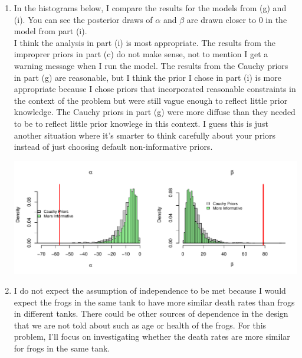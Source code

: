\documentclass[12pt]{article}\usepackage[]{graphicx}\usepackage[]{color}
\newenvironment{knitrout}{}{} %
\begin{document}
\begin{enumerate}
\begin{enumerate}
\begin{knitrout}
\end{knitrout}


\item In the histograms below, I compare the results for the models from (g) and (i). You can see the posterior draws of $\alpha$ and $\beta$ are drawn closer to $0$ in the model from part (i). \\

I think the analysis in part (i) is most appropriate. The results from the improprer priors in part (c) do not make sense, not to mention I get a warning message when I run the model. The results from the Cauchy priors in part (g) are reasonable, but I think the prior I chose in part (i) is more appropriate because I chose priors that incorporated reasonable constraints in the context of the problem but were still vague enough to reflect little prior knowledge. The Cauchy priors in part (g) were more diffuse than they needed to be to reflect little prior knowlege in this context. I guess this is just another situation where it's smarter to think carefully about your priors instead of just choosing default non-informative priors.

\begin{knitrout}\footnotesize
{}\color{fgcolor}
\includegraphics[width=\linewidth]{figure/compareall-1} 

\end{knitrout}


\item I do not expect the assumption of independence to be met because I would expect the frogs in the same tank to have more similar death rates than frogs in different tanks. There could be other sources of dependence in the design that we are not told about such as age or health of the frogs. For this problem, I'll focus on investigating whether the death rates are more similar for frogs in the same tank. \\


\end{enumerate}
\end{enumerate}
\end{document}

